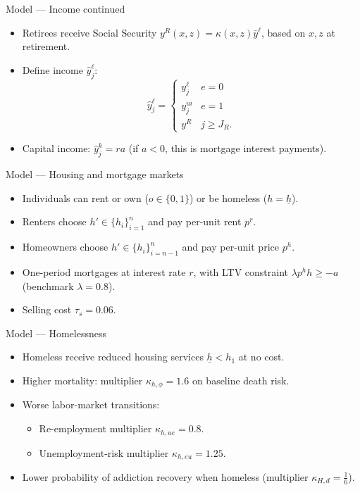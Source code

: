 \documentclass[10pt,aspectratio=169]{beamer}
\newcommand{\house}{h}         %
\newcommand{\leis}{\ell}       %
\begin{document}
\begin{frame}{Model --- Income continued}
\begin{itemize}
\item Retirees receive Social Security $y^R(x,z)=\kappa(x,z)\bar y^{\leis}$, based on $x,z$ at retirement.
\item Define income $\hat y^{\leis}_j$:
\[
\hat y^{\leis}_j=
\begin{cases}
y^{\leis}_j & e=0\\
y^{ui}_j & e=1\\
y^R & j\ge J_R.
\end{cases}
\]
\item Capital income: $\hat y^{k}_j=r a$ (if $a<0$, this is mortgage interest payments).
\end{itemize}
\end{frame}

\begin{frame}{Model --- Housing and mortgage markets}
\begin{itemize}
\item Individuals can rent or own ($o\in\{0,1\}$) or be homeless ($\house=\underline{h}$).
\item Renters choose $h'\in\{h_i\}_{i=1}^n$ and pay per-unit rent $p^r$.
\item Homeowners choose $h'\in\{h_i\}_{i=n-1}^n$ and pay per-unit price $p^h$.
\item One-period mortgages at interest rate $r$, with LTV constraint $\lambda p^h h \ge -a$ (benchmark $\lambda=0.8$).
\item Selling cost $\tau_s=0.06$.
\end{itemize}
\end{frame}

\begin{frame}{Model --- Homelessness}
\begin{itemize}
\item Homeless receive reduced housing services $\underline{h}<h_1$ at no cost.
\item Higher mortality: multiplier $\kappa_{h,\phi}=1.6$ on baseline death risk.
\item Worse labor-market transitions:
\begin{itemize}
\item Re-employment multiplier $\kappa_{h,ue}=0.8$.
\item Unemployment-risk multiplier $\kappa_{h,eu}=1.25$.
\end{itemize}
\item Lower probability of addiction recovery when homeless (multiplier $\kappa_{H,d}=\tfrac{1}{6}$).
\end{itemize}
\end{frame}
\end{document}
